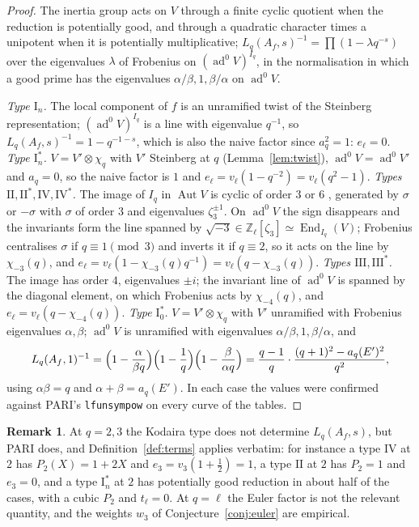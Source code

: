 \documentclass[11pt]{amsart}
\theoremstyle{definition}
\newtheorem{remark}[theorem]{Remark}
\newcommand{\Z}{\mathbb{Z}}
\newcommand{\ad}{\operatorname{ad}^0}
\begin{document}
\begin{proof}
The inertia group acts on $V$ through a finite cyclic quotient when the reduction is potentially good, and through a quadratic character times a unipotent when it is potentially multiplicative; $L_q(A_f,s)^{-1}=\prod(1-\lambda q^{-s})$ over the eigenvalues $\lambda$ of Frobenius on $(\ad V)^{I_q}$, in the normalisation in which a good prime has the eigenvalues $\alpha/\beta,1,\beta/\alpha$ on $\ad V$.

\emph{Type $\mathrm{I}_n$.} The local component of $f$ is an unramified twist of the Steinberg representation; $(\ad V)^{I_q}$ is a line with eigenvalue $q^{-1}$, so $L_q(A_f,s)^{-1}=1-q^{-1-s}$, which is also the naive factor since $a_q^2=1$: $e_\ell=0$. \emph{Type $\mathrm{I}_n^*$.} $V=V'\otimes\chi_q$ with $V'$ Steinberg at $q$ (Lemma~\ref{lem:twist}), $\ad V=\ad V'$ and $a_q=0$, so the naive factor is $1$ and $e_\ell=v_\ell(1-q^{-2})=v_\ell(q^2-1)$. \emph{Types $\mathrm{II},\mathrm{II}^*,\mathrm{IV},\mathrm{IV}^*$.} The image of $I_q$ in $\operatorname{Aut}V$ is cyclic of order $3$ or $6$ \cite{Kraus90}, generated by $\sigma$ or $-\sigma$ with $\sigma$ of order $3$ and eigenvalues $\zeta_3^{\pm1}$. On $\ad V$ the sign disappears and the invariants form the line spanned by $\sqrt{-3}\in\Z_\ell[\zeta_3]\simeq\operatorname{End}_{I_q}(V)$; Frobenius centralises $\sigma$ if $q\equiv1\pmod3$ and inverts it if $q\equiv2$, so it acts on the line by $\chi_{-3}(q)$, and $e_\ell=v_\ell(1-\chi_{-3}(q)q^{-1})=v_\ell(q-\chi_{-3}(q))$. \emph{Types $\mathrm{III},\mathrm{III}^*$.} The image has order $4$, eigenvalues $\pm i$; the invariant line of $\ad V$ is spanned by the diagonal element, on which Frobenius acts by $\chi_{-4}(q)$, and $e_\ell=v_\ell(q-\chi_{-4}(q))$. \emph{Type $\mathrm{I}_0^*$.} $V=V'\otimes\chi_q$ with $V'$ unramified with Frobenius eigenvalues $\alpha,\beta$; $\ad V$ is unramified with eigenvalues $\alpha/\beta,1,\beta/\alpha$, and
\[
L_q(A_f,1)^{-1}=\Bigl(1-\frac{\alpha}{\beta q}\Bigr)\Bigl(1-\frac1q\Bigr)\Bigl(1-\frac{\beta}{\alpha q}\Bigr)=\frac{q-1}{q}\cdot\frac{(q+1)^2-a_q(E')^2}{q^2},
\]
using $\alpha\beta=q$ and $\alpha+\beta=a_q(E')$. In each case the values were confirmed against PARI's \texttt{lfunsympow} on every curve of the tables.
\end{proof}

\begin{remark}\label{rem:wild}
At $q=2,3$ the Kodaira type does not determine $L_q(A_f,s)$, but PARI does, and Definition~\ref{def:terms} applies verbatim: for instance a type $\mathrm{IV}$ at $2$ has $P_2(X)=1+2X$ and $e_3=v_3(1+\tfrac12)=1$, a type $\mathrm{II}$ at $2$ has $P_2=1$ and $e_3=0$, and a type $\mathrm{I}_n^*$ at $2$ has potentially good reduction in about half of the cases, with a cubic $P_2$ and $t_\ell=0$. At $q=\ell$ the Euler factor is not the relevant quantity, and the weights $w_3$ of Conjecture~\ref{conj:euler} are empirical.
\end{remark}
\end{document}
